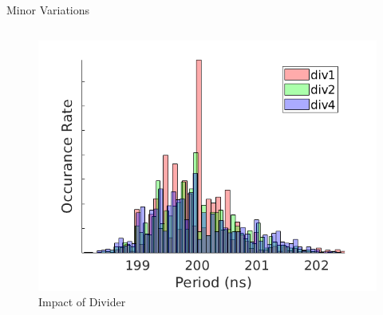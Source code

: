 \documentclass{beamer}
\begin{document}
\begin{frame}{Minor Variations}
\begin{columns}
		\vspace{-1.1 cm}
		\begin{figure}
			\includegraphics[width=\linewidth]{../dist_2}
			\vspace{-0.8 cm}
			\caption{Impact of Divider}
		\end{figure}
	\end{columns}	
\end{frame}
\end{document}
